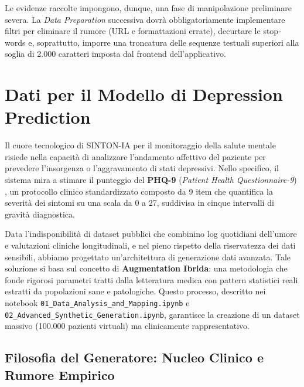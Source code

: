 Le evidenze raccolte impongono, dunque, una fase di manipolazione preliminare severa. La \textit{Data Preparation} successiva dovrà obbligatoriamente implementare filtri per eliminare il rumore (URL e formattazioni errate), decurtare le stop-words e, soprattutto, imporre una troncatura delle sequenze testuali superiori alla soglia di 2.000 caratteri imposta dal frontend dell'applicativo.

\section{Dati per il Modello di Depression Prediction}
\label{sec:data_depression}

Il cuore tecnologico di SINTON-IA per il monitoraggio della salute mentale risiede nella capacità di analizzare l'andamento affettivo del paziente per prevedere l'insorgenza o l'aggravamento di stati depressivi. Nello specifico, il sistema mira a stimare il punteggio del \textbf{PHQ-9} (\textit{Patient Health Questionnaire-9}) \cite{kroenke2001phq9}, un protocollo clinico standardizzato composto da 9 item che quantifica la severità dei sintomi su una scala da 0 a 27, suddivisa in cinque intervalli di gravità diagnostica.

Data l'indisponibilità di dataset pubblici che combinino log quotidiani dell'umore e valutazioni cliniche longitudinali, e nel pieno rispetto della riservatezza dei dati sensibili, abbiamo progettato un'architettura di generazione dati avanzata. Tale soluzione si basa sul concetto di \textbf{Augmentation Ibrida}: una metodologia che fonde rigorosi parametri tratti dalla letteratura medica con pattern statistici reali estratti da popolazioni sane e patologiche. Questo processo, descritto nei notebook \texttt{01\_Data\_Analysis\_and\_Mapping.ipynb} e \texttt{02\_Advanced\_Synthetic\_Generation.ipynb}, garantisce la creazione di un dataset massivo (100.000 pazienti virtuali) ma clinicamente rappresentativo.

\subsection{Filosofia del Generatore: Nucleo Clinico e Rumore Empirico}
\label{subsec:filosofia_generatore}

